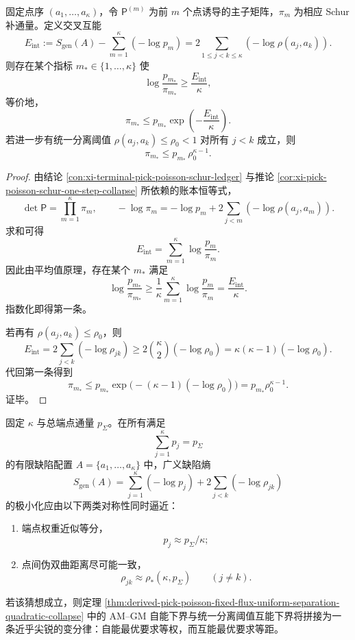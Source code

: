 \begin{theorem}\label{thm:derived-pick-poisson-schur-ledger-average-bottleneck}
固定点序 \((a_1,\dots,a_\kappa)\)，令 \(\mathsf P^{(m)}\) 为前 \(m\) 个点诱导的主子矩阵，\(\pi_m\) 为相应 Schur 补通量。定义交叉互能
\[
E_{\mathrm{int}}
:=
S_{\mathrm{gen}}(A)-\sum_{m=1}^{\kappa}(-\log p_m)
=
2\sum_{1\le j<k\le\kappa}(-\log\rho(a_j,a_k)).
\]
则存在某个指标 \(m_\ast\in\{1,\dots,\kappa\}\) 使
\[
\log\frac{p_{m_\ast}}{\pi_{m_\ast}}
\ge
\frac{E_{\mathrm{int}}}{\kappa},
\]
等价地，
\[
\pi_{m_\ast}\le p_{m_\ast}\exp\!\left(-\frac{E_{\mathrm{int}}}{\kappa}\right).
\]
若进一步有统一分离阈值 \(\rho(a_j,a_k)\le \rho_0<1\) 对所有 \(j<k\) 成立，则
\[
\pi_{m_\ast}\le p_{m_\ast}\,\rho_0^{\kappa-1}.
\]
\end{theorem}
\begin{proof}
由结论 \ref{con:xi-terminal-pick-poisson-schur-ledger} 与推论 \ref{cor:xi-pick-poisson-schur-one-step-collapse} 所依赖的账本恒等式，
\[
\det\mathsf P=\prod_{m=1}^{\kappa}\pi_m,
\qquad
-\log \pi_m=-\log p_m+2\sum_{j<m}(-\log\rho(a_j,a_m)).
\]
求和可得
\[
E_{\mathrm{int}}=\sum_{m=1}^{\kappa}\log\frac{p_m}{\pi_m}.
\]
因此由平均值原理，存在某个 \(m_\ast\) 满足
\[
\log\frac{p_{m_\ast}}{\pi_{m_\ast}}
\ge
\frac1\kappa\sum_{m=1}^{\kappa}\log\frac{p_m}{\pi_m}
=
\frac{E_{\mathrm{int}}}{\kappa}.
\]
指数化即得第一条。

若再有 \(\rho(a_j,a_k)\le \rho_0\)，则
\[
E_{\mathrm{int}}
=
2\sum_{j<k}(-\log\rho_{jk})
\ge
2\binom{\kappa}{2}(-\log\rho_0)
=
\kappa(\kappa-1)(-\log\rho_0).
\]
代回第一条得到
\[
\pi_{m_\ast}
\le
p_{m_\ast}\exp\bigl(-(\kappa-1)(-\log\rho_0)\bigr)
=
p_{m_\ast}\rho_0^{\kappa-1}.
\]
证毕。
\end{proof}

\begin{conjecture}\label{conj:derived-pick-poisson-equalweight-equidistance-minimizer}
固定 \(\kappa\) 与总端点通量 \(p_\Sigma\)。在所有满足
\[
\sum_{j=1}^{\kappa}p_j=p_\Sigma
\]
的有限缺陷配置 \(A=\{a_1,\dots,a_\kappa\}\) 中，广义缺陷熵
\[
S_{\mathrm{gen}}(A)
=
\sum_{j=1}^{\kappa}(-\log p_j)
+2\sum_{j<k}(-\log\rho_{jk})
\]
的极小化应由以下两类对称性同时逼近：
\begin{enumerate}
  \item 端点权重近似等分，
  \[
  p_j\approx p_\Sigma/\kappa;
  \]
  \item 点间伪双曲距离尽可能一致，
  \[
  \rho_{jk}\approx \rho_\ast(\kappa,p_\Sigma)
  \qquad (j\neq k).
  \]
\end{enumerate}
若该猜想成立，则定理 \ref{thm:derived-pick-poisson-fixed-flux-uniform-separation-quadratic-collapse} 中的 AM--GM 自能下界与统一分离阈值互能下界将拼接为一条近乎尖锐的变分律：自能最优要求等权，而互能最优要求等距。
\end{conjecture}
